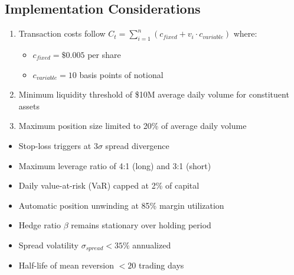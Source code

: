 \subsection{Implementation Considerations}
\begin{assumption} \label{assum:operations}
\begin{enumerate}
    \item Transaction costs follow $C_t = \sum_{i=1}^n (c_{fixed} + v_i \cdot c_{variable})$ where:
    \begin{itemize}
        \item $c_{fixed} = \$0.005$ per share
        \item $c_{variable} = 10$ basis points of notional
    \end{itemize}
    
    \item Minimum liquidity threshold of \$10M average daily volume for constituent assets
    
    \item Maximum position size limited to 20\% of average daily volume
\end{enumerate}
\end{assumption}

\begin{assumption} \label{assum:risk}
\begin{itemize}
    \item Stop-loss triggers at $3\sigma$ spread divergence
    \item Maximum leverage ratio of 4:1 (long) and 3:1 (short)
    \item Daily value-at-risk (VaR) capped at 2\% of capital
    \item Automatic position unwinding at 85\% margin utilization
\end{itemize}
\end{assumption}

\begin{assumption} \label{assum:model}
\begin{itemize}
    \item Hedge ratio $\beta$ remains stationary over holding period
    \item Spread volatility $\sigma_{spread} < 35\%$ annualized
    \item Half-life of mean reversion $< 20$ trading days
\end{itemize}
\end{assumption}


